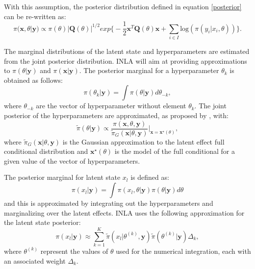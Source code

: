 \documentclass[
]{article}
\begin{document}
With this assumption, the posterior distribution defined in equation
\eqref{posterior} can be re-written as: \begin{equation}
\pi(\mathbf{x}, \mathbb{\theta} | \mathbf{y}) \propto \pi(\mathbb{\theta}) |\mathbf{Q(\mathbb \theta)}|^{1/2} exp \bigg \{ - \frac{1}{2} \mathbf{x}^T \mathbf{Q(\mathbb \theta)} \mathbf{x} + \sum_{i\in I}
\text{log}(\pi(y_i | x_i, \mathbb{\theta})) \bigg \}.
\end{equation}

The marginal distributions of the latent state and hyperparameters are
estimated from the joint posterior distribution. INLA will aim at
providing approximations to \(\pi(\mathbb{\theta}|\mathbf{y})\) and
\(\pi(\mathbf{x}|\mathbf{y})\). The posterior marginal for a
hyperparameter \(\theta_k\) is obtained as follows:
\begin{equation}\label{posteriorhyper}
 \pi(\theta_k| \mathbf{y}) = \int \pi(\mathbb{\theta} | \mathbf{y}) d\mathbb{\theta}_{-k},
\end{equation} where \(\mathbb{\theta}_{-k}\) are the vector of
hyperparameter without element \(\theta_k\). The joint posterior of the
hyperparameters are approximated, as proposed by
\citet{rue2009approximate}, with:
\begin{equation}\label{approxposteriorhyper}
\tilde{\pi}(\mathbb{\theta}|\mathbf{y}) \propto \frac{\pi(\mathbf{x},\mathbb{\theta},\mathbf{y})}{\tilde{\pi}_{G}(\mathbf{x}|\mathbb{\theta},\mathbf{y})} \bigg |_{\mathbf{x} = \mathbf{x}^{\star}(\mathbb{\theta})},
\end{equation} where
\(\tilde{\pi}_{G}(\mathbf{x}|\mathbb{\theta},\mathbf{y})\) is the
Gaussian approximation to the latent effect full conditional
distribution and \(\mathbf{x}^{\star}(\mathbb{\theta})\) is the model of
the full conditional for a given value of the vector of hyperparameters.

The posterior marginal for latent state \(x_l\) is defined as:
\begin{equation}\label{posteriorlatent}
\pi(x_l | \mathbf{y}) = \int \pi(x_l, \mathbb{\theta}| \mathbf{y}) \pi(\mathbb{\theta}| \mathbf{y}) d\mathbb{\theta}
\end{equation} and this is approximated by integrating out the
hyperparameters and marginalizing over the latent effects. INLA uses the
following approximation for the latent state posterior:
\begin{equation}\label{approxposteriorlatent}
\pi(x_l | \mathbf{y}) \approx \sum_{k = 1}^K \tilde{\pi}(x_l | \mathbb{\theta}^{(k)}, \mathbf{y}) \tilde{\pi}( \mathbb{\theta}^{(k)}|\mathbf{y}) \Delta_k,
\end{equation} where \(\theta^{(k)}\) represent the values of
\(\mathbb \theta\) used for the numerical integration, each with an
associated weight \(\Delta_k\).
\end{document}
